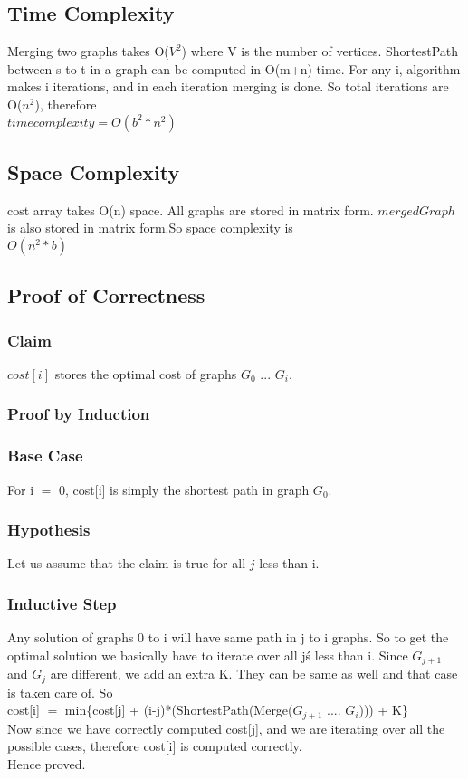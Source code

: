 \documentclass{article}
\begin{document}
\subsection{Time Complexity}
Merging two graphs takes O($V^2$) where V is the number of vertices. ShortestPath between s to t in a graph can be computed in O(m+n) time.
For any i, algorithm makes i iterations, and in each iteration merging is done. So total iterations are O($n^2$), therefore\\
\hspace*{2cm}$time complexity = O(b^2*n^2)$ \\

\subsection{Space Complexity}
cost array takes O(n) space. All graphs are stored in matrix form. $mergedGraph$ is also stored in matrix form.So space complexity is\\
\hspace*{2cm} $O(n^2*b)$

\subsection{Proof of Correctness}
\subsubsection{Claim}
$cost[i]$ stores the optimal cost of graphs $G_0$ ... $G_i$.  
\subsubsection{Proof by Induction}
\subsubsection{Base Case}
For i $=$ 0, cost[i] is simply the shortest path in graph $G_0$.
\subsubsection{Hypothesis}
Let us assume that the claim is true for all $j$ less than i.
\subsubsection{Inductive Step}
Any solution of graphs 0 to i will have same path in j to i graphs. So to get the optimal solution we basically have to iterate over all j\'s less
than i. Since $G_{j+1}$ and $G_{j}$ are different, we add an extra K. They can be same as well and that case is taken care of. So\\
cost[i] $=$ min\{cost[j] + (i-j)*(ShortestPath(Merge($G_{j+1}$ .... $G_i$))) + K\} \\
Now since we have correctly computed cost[j], and we are iterating over all the possible cases, therefore cost[i] is computed correctly.\\
Hence proved.\\
\end{document}
